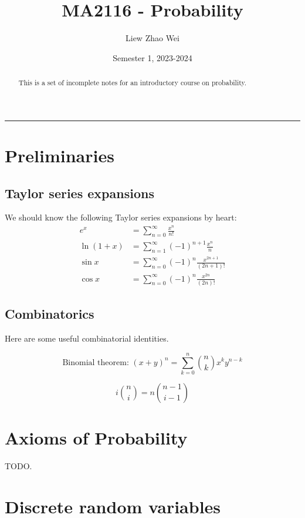 \documentclass{article}
\title{MA2116 - Probability}
\author{Liew Zhao Wei}
\date{Semester 1, 2023-2024}
\begin{document}
\maketitle

\begin{abstract}
  This is a set of incomplete notes for an introductory course on probability.
\end{abstract}

\hrule

\section{Preliminaries}

\subsection{Taylor series expansions}

We should know the following Taylor series expansions by heart:
\begin{align*}
  e^x        & = \sum\limits_{n = 0}^\infty \frac{x^n}{n!}
  \\
  \ln(1 + x) & = \sum\limits_{n = 1}^\infty (-1)^{n + 1} \frac{x^n}{n}
  \\
  \sin x     & = \sum\limits_{n = 0}^\infty (-1)^n \frac{x^{2n + 1}}{(2n + 1)!}
  \\
  \cos x     & = \sum\limits_{n = 0}^\infty (-1)^n \frac{x^{2n}}{(2n)!}
\end{align*}

\subsection{Combinatorics}

Here are some useful combinatorial identities.

\[
  \text{Binomial theorem: } (x + y)^n = \sum\limits_{k = 0}^n \binom{n}{k} x^k y^{n - k}
\]

\[
  i \binom{n}{i} = n \binom{n - 1}{i - 1}
\]

\section{Axioms of Probability}

TODO.

\section{Discrete random variables}
\end{document}
